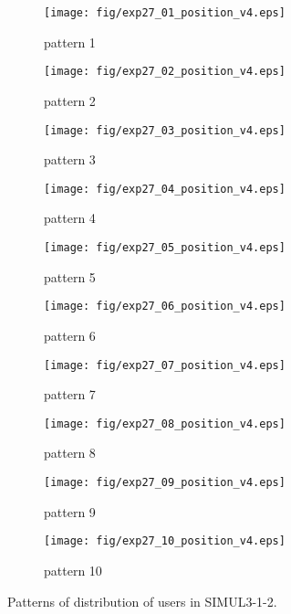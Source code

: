 \begin{figure}
	\begin{center}
		\begin{subfigure}[b]{0.32\textwidth}
			\texttt{[image: fig/exp27\_01\_position\_v4.eps]}
			\caption{pattern 1}
			\label{figure:simul3_1_2_a}
		\end{subfigure}
		\begin{subfigure}[b]{0.32\textwidth}
			\texttt{[image: fig/exp27\_02\_position\_v4.eps]}
			\caption{pattern 2}
			\label{figure:simul3_1_2_b}
		\end{subfigure}
		\begin{subfigure}[b]{0.32\textwidth}
			\texttt{[image: fig/exp27\_03\_position\_v4.eps]}
			\caption{pattern 3}
			\label{figure:simul3_1_2_c}
		\end{subfigure}
		\begin{subfigure}[b]{0.32\textwidth}
			\texttt{[image: fig/exp27\_04\_position\_v4.eps]}
			\caption{pattern 4}
			\label{figure:simul3_1_2_d}
		\end{subfigure}
		\begin{subfigure}[b]{0.32\textwidth}
			\texttt{[image: fig/exp27\_05\_position\_v4.eps]}
			\caption{pattern 5}
			\label{figure:simul3_1_2_e}
		\end{subfigure}
		\begin{subfigure}[b]{0.32\textwidth}
			\texttt{[image: fig/exp27\_06\_position\_v4.eps]}
			\caption{pattern 6}
			\label{figure:simul3_1_2_f}
		\end{subfigure}
		\begin{subfigure}[b]{0.32\textwidth}
			\texttt{[image: fig/exp27\_07\_position\_v4.eps]}
			\caption{pattern 7}
			\label{figure:simul3_1_2_g}
		\end{subfigure}
		\begin{subfigure}[b]{0.32\textwidth}
			\texttt{[image: fig/exp27\_08\_position\_v4.eps]}
			\caption{pattern 8}
			\label{figure:simul3_1_2_h}
		\end{subfigure}
		\begin{subfigure}[b]{0.32\textwidth}
			\texttt{[image: fig/exp27\_09\_position\_v4.eps]}
			\caption{pattern 9}
			\label{figure:simul3_1_2_i}
		\end{subfigure}
		\begin{subfigure}[b]{0.32\textwidth}
			\texttt{[image: fig/exp27\_10\_position\_v4.eps]}
			\caption{pattern 10}
			\label{figure:simul3_1_2_j}
		\end{subfigure}
		\caption{Patterns of distribution of users in SIMUL3-1-2.}
		\label{figure:simul3_1_2_p}
	\end{center}
\end{figure}

